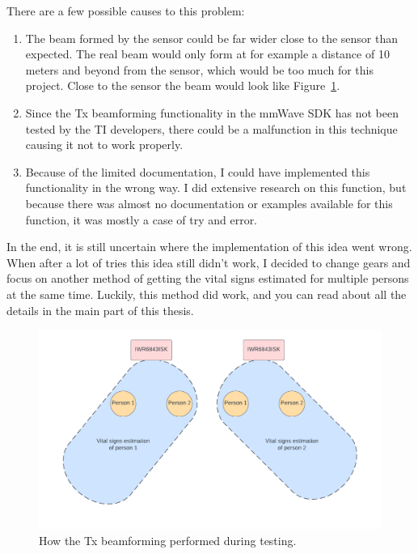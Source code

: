 There are a few possible causes to this problem:

\begin{enumerate}
    \item The beam formed by the sensor could be far wider close to the sensor than expected. The real beam would only form at for example a distance of 10 meters and beyond from the sensor, which would be too much for this project. Close to the sensor the beam would look like Figure~\ref{fig:tx_beam_real_life}.
    \item Since the Tx beamforming functionality in the mmWave SDK has not been tested by the TI developers, there could be a malfunction in this technique causing it not to work properly.
    \item Because of the limited documentation, I could have implemented this functionality in the wrong way. I did extensive research on this function, but because there was almost no documentation or examples available for this function, it was mostly a case of try and error.
\end{enumerate}

In the end, it is still uncertain where the implementation of this idea went wrong. When after a lot of tries this idea still didn't work, I decided to change gears and focus on another method of getting the vital signs estimated for multiple persons at the same time. Luckily, this method did work, and you can read about all the details in the main part of this thesis.

\begin{figure}[t]
    \centering
    \includegraphics[width=.95\textwidth]{figures/appendix/tx_beamforming_real_life.pdf}
    \caption{How the Tx beamforming performed during testing.}
    \label{fig:tx_beam_real_life}
\end{figure}